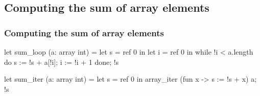 \subsection*{Computing the sum of array elements}
\begin{frame}[fragile]\frametitle{Computing the sum of array elements}
\begin{adjustwidth}{-0.7cm}{1.5cm}
\begin{footnotesize}
\begin{minipage}[t]{0.4\textwidth}
\begin{whycode}  
 let sum_loop (a: array int) 	
 = let s = ref 0 in
   let i = ref 0 in
   while !i < a.length do
     s := !s + a[!i];
     i := !i + 1
   done; 
   !s 
\end{whycode}
\end{minipage}\hfill
\begin{minipage}[t]{0.4\textwidth}
\begin{whycode} 
  let sum_iter (a: array int)
  = let s = ref 0 in
    array_iter (fun x -> s := !s + x) a;  
    !s
\end{whycode}	
\end{minipage}
\end{footnotesize}
\end{adjustwidth}
\end{frame}

